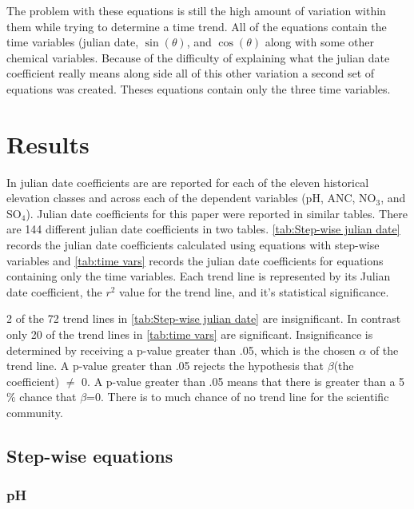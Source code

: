  

 The problem with these equations is still the high amount of variation within them while trying to determine a time trend.  All of the equations contain the time variables (julian date, $\sin(\theta)$, and $\cos(\theta)$ along with some other chemical variables.  Because of the difficulty of explaining what the julian date coefficient really means along side all of this other variation a second set of equations was created.  Theses equations contain only the three time variables.
 
\section{Results}

In \citet{robinson2008ph} julian date coefficients are are reported for each of the eleven historical elevation classes and across each of the dependent variables (pH, ANC, NO$_3$, and SO$_4$).  Julian date coefficients for this paper were reported in similar tables.  There are 144 different julian date coefficients in two tables.  \autoref{tab:Step-wise julian date} records the julian date coefficients calculated using equations with step-wise variables and \autoref{tab:time vars} records the julian date coefficients for  equations containing only the time variables.  Each trend line is represented by its Julian date coefficient, the $r^2$ value for the trend line, and it's statistical significance.

2 of the 72 trend lines in \autoref{tab:Step-wise julian date} are insignificant.  In contrast only 20 of the trend lines in \autoref{tab:time vars} are significant.   Insignificance is determined  by receiving a p-value greater than .05, which is the chosen $\alpha$ of the trend line.  A p-value greater than .05 rejects the hypothesis that $\beta$(the coefficient) $\neq$ 0.  A p-value greater than .05 means that there is greater than a 5$\%$ chance that $\beta$=0.  There is to much chance of no trend line for the scientific community.

\subsection{Step-wise equations}

\subsubsection{pH}

